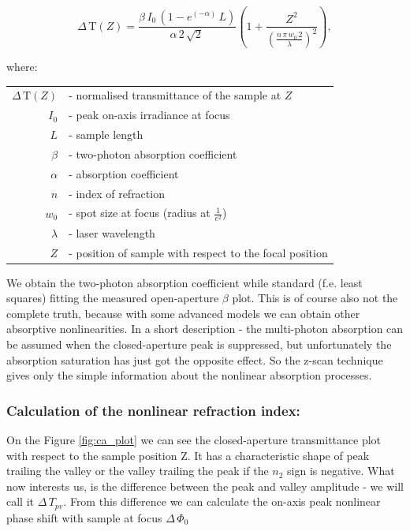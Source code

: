 \documentclass[12pt,twoside,a4paper]{article}
\numberwithin{equation}{subsection}
\numberwithin{figure}{subsection}
\begin{document}
\begin{equation}
  \Delta \,\mathrm{T}(Z)=\frac {\beta \,{I_{0}}\,(1 - e^{( - \alpha )}\,L)}{\alpha \,2\,\sqrt{2}\,} 
  \left(  \! 1 + \frac {Z^{2}}{(\frac {n\,\pi \,{w_{0}}\,2}{\lambda })^{2}} \!  \right) ,
\end{equation}
 
where: 

\begin{tabular}{ r l }
   $\Delta \,\mathrm{T}(Z)$ & - normalised transmittance of the sample at $Z$ \\
   ${I_{0}}$ & - peak on-axis irradiance at focus \\
   $L$ & - sample length \\
   $\beta $ & - two-photon absorption coefficient \\
   $\alpha $ & - absorption coefficient \\
   $n$ & - index of refraction \\
   ${w_{0}}$ & - spot size at focus (radius at $\frac {1}{e^{2}}$) \\
   $\lambda $ & - laser wavelength \\
   $Z$ & - position of sample with respect to the focal position \\
\end{tabular}

We obtain the two-photon absorption coefficient while standard (f.e. least squares) fitting the measured open-aperture $\beta $ 
plot. This is of course also not the complete truth, because with some advanced models we can obtain other absorptive
nonlinearities. In a short description - the multi-photon absorption can be assumed when the closed-aperture peak is suppressed,
but unfortunately the absorption saturation has just got the opposite effect. So the z-scan technique gives only the simple
information about the nonlinear absorption processes.

\subsubsection*{Calculation of the nonlinear refraction index:}

On the Figure \ref{fig:ca_plot} we can see the closed-aperture transmittance plot with respect to the sample position Z. It has a
characteristic shape of peak trailing the valley or the valley trailing the peak if the ${n_{2}}$ sign is negative. What now
interests us, is the difference between the peak and valley amplitude - we will call it $\Delta \,{T_{pv}}$. From this difference
we can calculate the on-axis peak nonlinear phase shift with sample at focus $\Delta \,{\Phi_{0}}$
\end{document}
